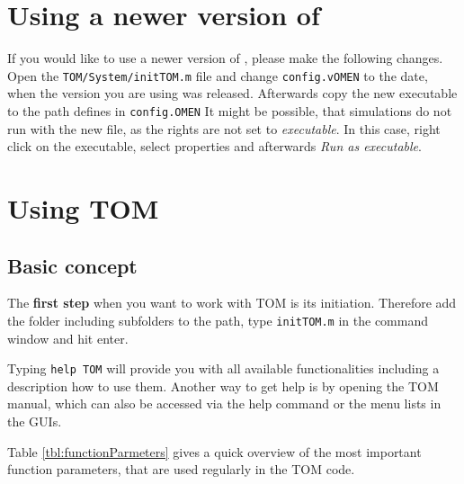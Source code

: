	\section{Using a newer version of \omen}
		If you would like to use a newer version of \omen, please make the following changes. Open the \lstinline{TOM/System/initTOM.m} file
		and change \lstinline{config.vOMEN} to the date, when the \omen version you are using was released. Afterwards copy the new \omen executable
		to the path defines in \lstinline{config.OMEN}
		It might be possible, that simulations do not run with the new file, as the rights are not set to {\it executable}. In this case, right click on
		the executable, select properties and afterwards {\it Run as executable}. 
	
	
	\section{Using TOM}
		\subsection{Basic concept}
				The {\bf first step} when you want to work with \gls{TOM} is its initiation. Therefore add the \software folder including subfolders to the \matlab path,
				type \lstinline{initTOM.m} in the command window and hit enter.
				
				Typing \lstinline{help TOM} will provide you with all available functionalities including a description how to use them. Another way to
				get help is by opening the \gls{TOM} manual, which can also be accessed via the help command or the menu lists in the \glspl{GUI}.
				
				Table \ref{tbl:functionParmeters} gives a quick overview of the most important function parameters, that are used regularly in the \gls{TOM} code.
			
